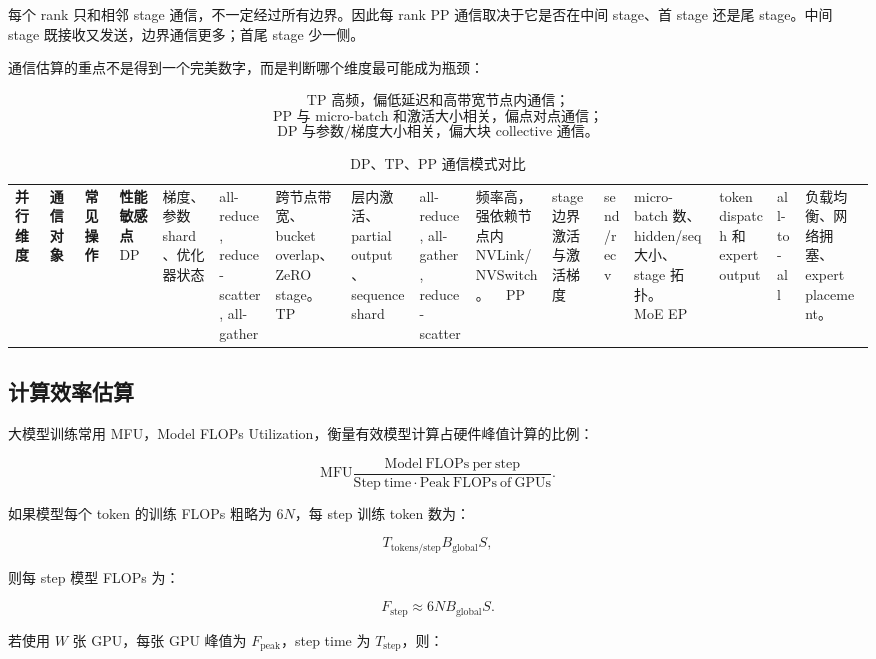 每个 rank 只和相邻 stage 通信，不一定经过所有边界。因此每 rank PP 通信取决于它是否在中间 stage、首 stage 还是尾 stage。中间 stage 既接收又发送，边界通信更多；首尾 stage 少一侧。

通信估算的重点不是得到一个完美数字，而是判断哪个维度最可能成为瓶颈：

\[
\text{TP 高频，偏低延迟和高带宽节点内通信；}
\]
\[
\text{PP 与 micro-batch 和激活大小相关，偏点对点通信；}
\]
\[
\text{DP 与参数/梯度大小相关，偏大块 collective 通信。}
\]

\begin{table}[H]
\centering
\small
\caption{DP、TP、PP 通信模式对比}
\label{tab:dp-tp-pp-communication-comparison}
\begin{tabular}{p{}p{}p{}p{}}
\toprule
\textbf{并行维度} & \textbf{通信对象} & \textbf{常见操作} & \textbf{性能敏感点} \
\midrule
DP
& 梯度、参数 shard、优化器状态
& all-reduce, reduce-scatter, all-gather
& 跨节点带宽、bucket overlap、ZeRO stage。 \
\midrule
TP
& 层内激活、partial output、sequence shard
& all-reduce, all-gather, reduce-scatter
& 频率高，强依赖节点内 NVLink/NVSwitch。 \
\midrule
PP
& stage 边界激活与激活梯度
& send/recv
& micro-batch 数、hidden/seq 大小、stage 拓扑。 \
\midrule
MoE EP
& token dispatch 和 expert output
& all-to-all
& 负载均衡、网络拥塞、expert placement。 \
\bottomrule
\end{tabular}
\end{table}

\subsection{计算效率估算}
\label{subsec:compute-efficiency-estimation}

大模型训练常用 MFU，Model FLOPs Utilization，衡量有效模型计算占硬件峰值计算的比例：

\[
\mathrm{MFU}
\frac{\mathrm{Model\ FLOPs\ per\ step}}
{\mathrm{Step\ time}\cdot \mathrm{Peak\ FLOPs\ of\ GPUs}}.
\]

如果模型每个 token 的训练 FLOPs 粗略为 $6N$，每 step 训练 token 数为：

\[
T_{\mathrm{tokens/step}}
B_{\mathrm{global}}S,
\]

则每 step 模型 FLOPs 为：

\[
F_{\mathrm{step}}
\approx
6N B_{\mathrm{global}}S.
\]

若使用 $W$ 张 GPU，每张 GPU 峰值为 $F_{\mathrm{peak}}$，step time 为 $T_{\mathrm{step}}$，则：

